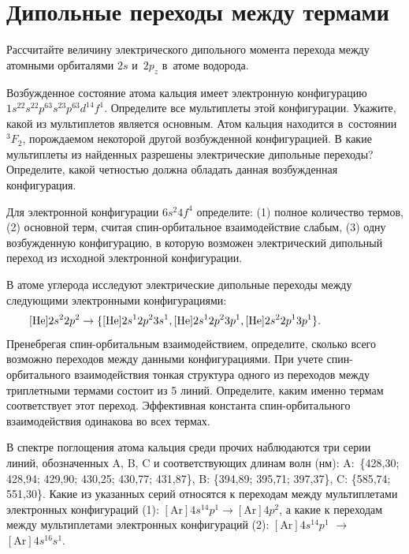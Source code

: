 \setmainfont{Noto Serif}
\setsansfont{Noto Sans}
\setmonofont{Noto Sans Mono}


\section{Дипольные переходы между термами}

 Рассчитайте величину электрического дипольного момента перехода между атомными орбиталями $2s$ и~$2p_z$ в~атоме водорода.
\par
{} Возбужденное состояние атома кальция имеет электронную конфигурацию $1s^22s^22p^63s^23p^63d^14f^1$. Определите все мультиплеты этой конфигурации. Укажите, какой из мультиплетов является основным. Атом кальция находится в~состоянии $^3F_2$, порождаемом некоторой другой возбужденной конфигурацией. В какие мультиплеты из найденных разрешены электрические дипольные переходы? Определите, какой четностью должна обладать данная возбужденная конфигурация.
\par
{} Для электронной конфигурации $6s^2 4f^4$ определите: (1) полное количество термов, (2) основной терм, считая спин-орбитальное взаимодействие слабым, (3) одну возбужденную конфигурацию, в которую возможен электрический дипольный переход из исходной электронной конфигурации.
\par
{} В атоме углерода исследуют электрические дипольные переходы между следующими электронными конфигурациями:
\begin{equation*}
\begin{aligned}
\relax [\text{He}]2s^2 2p^2 \rightarrow \{[\text{He}]2s^1 2p^2 3s^1, [\text{He}]2s^1 2p^2 3p^1, [\text{He}]2s^2 2p^1 3p^1\}.\hspace{19mm}
\end{aligned}
\end{equation*}
Пренебрегая спин-орбитальным взаимодействием, определите, сколько всего возможно переходов между данными конфигурациями. При учете спин-орбитального взаимодействия тонкая структура одного из переходов между триплетными термами состоит из 5 линий. Определите, каким именно термам соответствует этот переход. Эффективная константа спин-орбитального взаимодействия одинакова во всех термах.
\par
{} В спектре поглощения атома кальция среди прочих наблюдаются три серии линий, обозначенных A, B, C и соответствующих длинам волн (нм): A:~\{428,30; 428,94; 429,90; 430,25; 430,77; 431,87\}, B: \{394,89; 395,71; 397,37\}, C: \{585,74; 551,30\}. Какие из указанных серий относятся к переходам между мультиплетами электронных конфигураций (1): $[\text{Ar}]4s^14p^1 \rightarrow [\text{Ar}]4p^2$, а какие к переходам между мультиплетами электронных конфигураций (2): $[\text{Ar}]4s^14p^1$ $\rightarrow$ $[\text{Ar}]4s^16s^1$.
